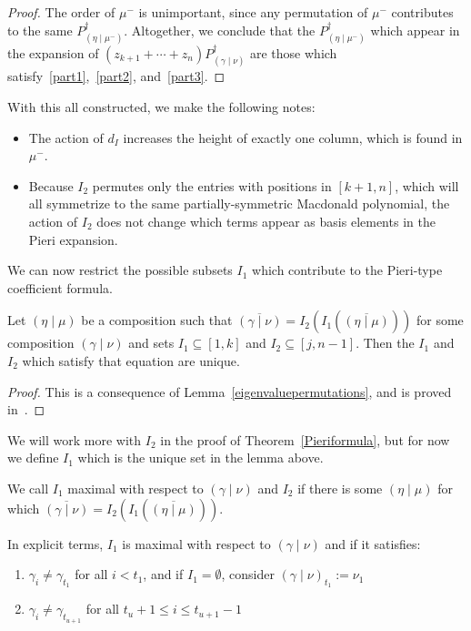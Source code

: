 \documentclass[ALCO]{cedram}
\newcommand{\PB}[1]{P_{#1}^\dagger}
\newcommand{\gammanu}{{(\gamma \mid \nu)}}
\newcommand{\etamu}{{(\eta \mid \mu^-)}}
\newcommand{\dI}{d_I}
\begin{document}
\begin{proof}
The order of $\mu^-$ is unimportant, since any permutation of $\mu^-$ contributes to the same $\PB{\etamu}$. Altogether, we conclude that the $\PB{\etamu}$ which appear in the expansion of $(z_{k+1} + \dotsm + z_{n})\PB{\gammanu}$ are those which satisfy~\eqref{part1},~\eqref{part2}, and~\eqref{part3}. \qedhere \end{proof}



 With this all constructed, we make the following notes:
\begin{itemize}
    \item The action of $\dI$ increases the height of exactly one column, which is found in $\mu^-$.
    \item Because $I_2$ permutes only the entries with positions in $[k+1,n]$, which will all symmetrize to the same partially-symmetric Macdonald polynomial, the action of $I_2$ does not change which terms appear as basis elements in the Pieri expansion.
\end{itemize}

We can now restrict the possible subsets $I_1$ which contribute to the Pieri-type coefficient formula.

\begin{lemm}\label{comaximality}Let $(\eta \mid \mu)$ be a composition such that $\overline{\gammanu} = I_2\left( I_1 \left(\overline{(\eta \mid \mu)} \right)\right)$ for some composition $\gammanu$ and sets $I_1\subseteq [1,k]$ and $I_2 \subseteq [j,n-1]$. Then the $I_1$ and $I_2$ which satisfy that equation are unique.
\end{lemm}
\begin{proof}
This is a consequence of Lemma~\ref{eigenvaluepermutations}, and is proved in~\cite[proof of Lemma~4.3] {MR1456318}.
\end{proof}

We will work more with $I_2$ in the proof of Theorem~\ref{Pieriformula}, but for now we define $I_1$ which is the unique set in the lemma above.


\begin{defi}\label{maximality}
We call $I_1$ maximal with respect to $(\gamma \mid \nu)$ and $I_2$ if there is some $(\eta \mid \mu)$ for which $\overline{(\gamma \mid \nu)} = I_2 \left( I_1 \left( \overline{(\eta \mid \mu)} \right)\right)$.
\end{defi}
In explicit terms, $I_1$ is maximal with respect to $\gammanu$ and if it satisfies:
\begin{enumerate}
    \item $\gamma_i \neq \gamma_{t_1}$ for all $i< t_1$, and if $I_1=\emptyset$, consider $\gammanu_{t_1} := \nu_1$ \item $\gamma_i \neq \gamma_{t_{u+1}}$ for all $t_u+1 \leq i \leq t_{u+1}-1$
\end{enumerate}
\end{document}
